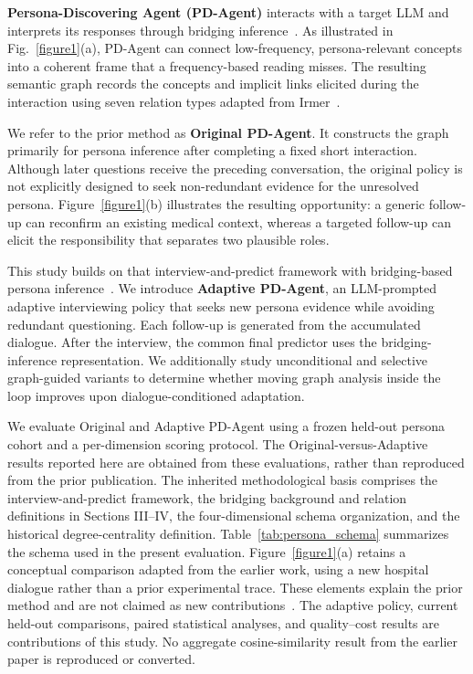 \documentclass{ieeeaccess}
\begin{document}
\textbf{Persona-Discovering Agent (PD-Agent)} interacts with a target LLM and interprets its
responses through bridging inference~\cite{yang2026pragmatic}. As illustrated in
Fig.~\ref{figure1}(a), PD-Agent can
connect low-frequency, persona-relevant concepts into a coherent frame that a
frequency-based reading misses. The resulting semantic graph records the concepts and
implicit links elicited during the interaction using seven relation types adapted from
Irmer~\cite{irmer2011bridging}.

We refer to the prior method as \textbf{Original PD-Agent}. It constructs the graph
primarily for persona inference after completing a fixed short interaction. Although later questions receive the preceding
conversation, the original policy is not explicitly designed to seek non-redundant evidence
for the unresolved persona. Figure~\ref{figure1}(b) illustrates the resulting opportunity: a
generic follow-up can reconfirm an existing medical context, whereas a targeted follow-up can
elicit the responsibility that separates two plausible roles.

This study builds on that interview-and-predict framework with bridging-based persona
inference~\cite{yang2026pragmatic}. We introduce \textbf{Adaptive PD-Agent}, an LLM-prompted
adaptive interviewing policy that seeks new persona evidence while avoiding redundant
questioning. Each follow-up is generated from the accumulated dialogue. After the interview,
the common final predictor uses the bridging-inference representation. We additionally
study unconditional and selective graph-guided variants to determine whether moving graph
analysis inside the loop improves upon dialogue-conditioned adaptation.

We evaluate Original and Adaptive PD-Agent using a frozen held-out persona cohort and a
per-dimension scoring protocol. The Original-versus-Adaptive results reported here are
obtained from these evaluations, rather than reproduced from the prior publication.
The inherited methodological basis comprises the interview-and-predict framework,
the bridging background and relation definitions in Sections III--IV, the four-dimensional
schema organization, and the historical degree-centrality definition.
Table~\ref{tab:persona_schema} summarizes the schema used in the present evaluation.
Figure~\ref{figure1}(a) retains a conceptual comparison adapted from the earlier work,
using a new hospital dialogue rather than a prior experimental trace.
These elements explain the prior method and are not claimed as new
contributions~\cite{yang2026pragmatic}. The adaptive policy, current held-out comparisons,
paired statistical analyses, and quality--cost results are contributions of this study.
No aggregate cosine-similarity result from the earlier paper is reproduced or converted.
\end{document}

